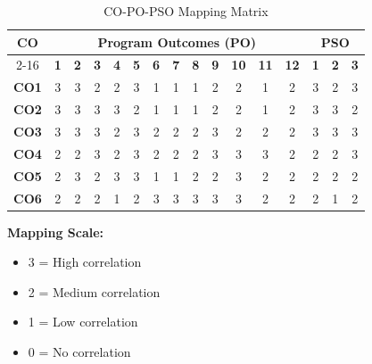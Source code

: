 \begin{table}[h]
\centering
\small
\begin{tabular}{|c|c|c|c|c|c|c|c|c|c|c|c|c|c|c|c|}
\hline
\multirow{2}{*}{\textbf{CO}} & \multicolumn{12}{c|}{\textbf{Program Outcomes (PO)}} & \multicolumn{3}{c|}{\textbf{PSO}} \\
\cline{2-16}
 & \textbf{1} & \textbf{2} & \textbf{3} & \textbf{4} & \textbf{5} & \textbf{6} & \textbf{7} & \textbf{8} & \textbf{9} & \textbf{10} & \textbf{11} & \textbf{12} & \textbf{1} & \textbf{2} & \textbf{3} \\
\hline
\textbf{CO1} & 3 & 3 & 2 & 2 & 3 & 1 & 1 & 1 & 2 & 2 & 1 & 2 & 3 & 2 & 3 \\
\hline
\textbf{CO2} & 3 & 3 & 3 & 3 & 2 & 1 & 1 & 1 & 2 & 2 & 1 & 2 & 3 & 3 & 2 \\
\hline
\textbf{CO3} & 3 & 3 & 3 & 2 & 3 & 2 & 2 & 2 & 3 & 2 & 2 & 2 & 3 & 3 & 3 \\
\hline
\textbf{CO4} & 2 & 2 & 3 & 2 & 3 & 2 & 2 & 2 & 3 & 3 & 3 & 2 & 2 & 2 & 3 \\
\hline
\textbf{CO5} & 2 & 3 & 2 & 3 & 3 & 1 & 1 & 2 & 2 & 3 & 2 & 2 & 2 & 2 & 2 \\
\hline
\textbf{CO6} & 2 & 2 & 2 & 1 & 2 & 3 & 3 & 3 & 3 & 3 & 2 & 2 & 2 & 1 & 2 \\
\hline
\end{tabular}
\caption{CO-PO-PSO Mapping Matrix}
\end{table}

\vspace{0.5cm}

\textbf{Mapping Scale:}
\begin{itemize}
    \item 3 = High correlation
    \item 2 = Medium correlation
    \item 1 = Low correlation
    \item 0 = No correlation
\end{itemize}

\newpage
